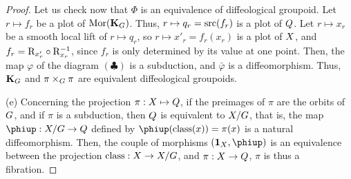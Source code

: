 \begin{proof}
  Let us check now that $\Phi$ is an equivalence of diffeological groupoid.
  Let $r \mapsto f_r$ be a plot of ${\operatorname{Mor}}({\mathbf K}_G)$.
  Thus,
  $r \mapsto q_r = {\operatorname{src}}(f_r)$ is a plot of $Q$.
  Let $r \mapsto x_r$ be a smooth local lift of $r \mapsto q_r$, so $r \mapsto x'_r = f_r(x_r)$ is a plot of $X$,
  and $f_r = \mathrm{R}_{x'_r} \circ \mathrm{R}_{x_r}^{-1}$,
  since $f_r$ is only determined by its value at one point.
  Then,
  the map $\varphi$ of the diagram $(\clubsuit)$ is a subduction,
  and $\bar\varphi$ is a diffeomorphism.
  Thus,
  ${\mathbf K}_G$ and $\pi \times_G \pi$ are equivalent diffeological groupoids.
  \begin{center}
  \end{center}
  (e) Concerning the projection $\pi : X \mapsto Q$,
  if the preimages of $\pi$ are the orbits of $G$,
  and if $\pi$ is a subduction,
  then $Q$ is equivalent to $X/G$,
  that is,
  the map $\varphi : \X/\G \to \Q$ defined by $\varphi(\class(x)) = \pi(x)$ is a natural diffeomorphism.
  Then,
  the couple of morphisms $(\id_\X, \varphi)$ is an equivalence between the projection $\operatorname{class} : X \to X/G$,
  and $\pi : X \to Q$, $\pi$ is thus a fibration.
\end{proof}

